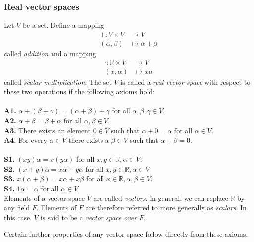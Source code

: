 \documentclass[12pt,letterpaper,reqno]{article}
\numberwithin{equation}{section}
\begin{document}
\subsubsection{Real vector spaces}
\begin{defn} \label{def:vector_space}
	Let $V$ be a set. Define a mapping
\begin{align*}
	+:V\times V &\to V \\
	(\alpha,\beta) &\mapsto \alpha+\beta
\end{align*}
called \emph{addition} and a mapping
\begin{align*}
	\cdot :\mathbb{R}\times V &\to V \\
	(x,\alpha) &\mapsto x\alpha
\end{align*}
called \emph{scalar multiplication}. The set $V$ is called a \emph{real vector space} with respect to these two operations if the following axioms hold: \\
\\
{\bf A1.} $\alpha+(\beta+\gamma)=(\alpha+\beta)+\gamma$ for all  $\alpha,\beta,\gamma \in V$. \\
{\bf A2.} $\alpha+\beta=\beta+\alpha$ for all $\alpha,\beta \in V$. \\
{\bf A3.} There exists an element $0 \in V$ such that $\alpha+0=\alpha$ for all $\alpha \in V$. \\
{\bf A4.} For every $\alpha \in V$ there exists a $\beta \in V$ such that $\alpha+\beta=0$. \\
\\
{\bf S1.} $(xy)\alpha=x(y\alpha)$ for all $x,y \in \mathbb{R}, \alpha \in V$. \\
{\bf S2.} $(x+y)\alpha=x\alpha+y\alpha$ for all $x,y \in \mathbb{R}, \alpha \in V$ \\
{\bf S3.} $x(\alpha+\beta)=x\alpha+x\beta$ for all $x \in \mathbb{R}, \alpha,\beta \in V$. \\
{\bf S4.} $1\alpha=\alpha$ for all $\alpha \in V$. \\

Elements of a vector space $V$ are called \emph{vectors}. In general, we can replace $\mathbb{R}$ by any field $F$. Elements of $F$ are therefore referred to more generally as \emph{scalars}. In this case, $V$ is said to be a \emph{vector space over} $F$.
\end{defn}

Certain further properties of any vector space follow directly from these axioms.
\end{document}
